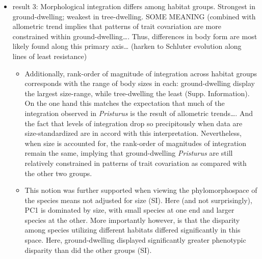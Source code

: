 \documentclass[
  11pt,
]{article}
\providecommand{\tightlist}{%
  \setlength{\itemsep}{0pt}\setlength{\parskip}{0pt}}
\providecommand{\DIFaddbegin}{} %
\providecommand{\DIFaddend}{} %
\newcommand{\DIFaddincludegraphics}[2][]{{\color{blue}\fbox{\DIFOincludegraphics[#1]{#2}}}} %
\DeclareRobustCommand{\DIFaddbegin}{\DIFOaddbegin \let\includegraphics\DIFaddincludegraphics} %
\DeclareRobustCommand{\DIFaddend}{\DIFOaddend \let\includegraphics\DIFOincludegraphics} %
\begin{document}
\begin{itemize}
\tightlist
\DIFaddend \item
  result 3: Morphological integration differs among habitat groups.
  Strongest in ground-dwelling; weakest in tree-dwelling. SOME MEANING
  (combined with allometric trend implies that patterns of trait
  covariation are more constrained within ground-dwelling\ldots. Thus,
  differences in body form are most likely found along this primary
  axis\ldots{} (harken to Schluter evolution along lines of least
  resistance)

  \begin{itemize}
  \tightlist
  \item
    Additionally, rank-order of magnitude of integration across habitat
    groups corresponds with the range of body sizes in each:
    ground-dwelling display the largest size-range, while tree-dwelling
    the least (Supp. Information). On the one hand this matches the
    expectation that much of the integration observed in
    \emph{Pristurus} is the result of allometric trends\ldots. And the
    fact that levels of integration drop so precipitously when data are
    size-standardized are in accord with this interpretation.
    Nevertheless, when size is accounted for, the rank-order of
    magnitudes of integration remain the same, implying that
    ground-dwelling \emph{Pristurus} are still relatively constrained in
    patterns of trait covariation as compared with the other two
    groups.\\
  \item
    This notion was further supported when viewing the phylomorphospace
    of the species means not adjusted for size (SI). Here (and not
    surprisingly), PC1 is dominated by size, with small species at one
    end and larger species at the other. More importantly however, is
    that the disparity among species utilizing different habitats
    differed significantly in this space. Here, ground-dwelling
    displayed significantly greater phenotypic disparity than did the
    other groups (SI).
  \end{itemize}
\DIFaddbegin \end{itemize}
\end{document}
